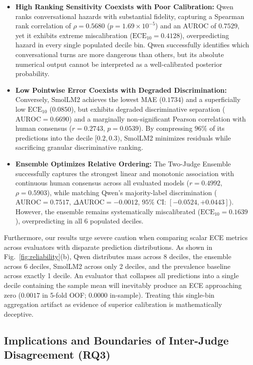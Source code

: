 \begin{itemize}
    \item \textbf{High Ranking Sensitivity Coexists with Poor Calibration:} Qwen ranks conversational hazards with substantial fidelity, capturing a Spearman rank correlation of $\rho=0.5680$ ($p=1.69\times 10^{-5}$) and an $\text{AUROC}$ of $0.7529$, yet it exhibits extreme miscalibration ($\text{ECE}_{10}=0.4128$), overpredicting hazard in every single populated decile bin. Qwen successfully identifies which conversational turns are more dangerous than others, but its absolute numerical output cannot be interpreted as a well-calibrated posterior probability.
    \item \textbf{Low Pointwise Error Coexists with Degraded Discrimination:} Conversely, SmolLM2 achieves the lowest MAE ($0.1734$) and a superficially low $\text{ECE}_{10}$ ($0.0850$), but exhibits degraded discriminative separation ($\text{AUROC}=0.6690$) and a marginally non-significant Pearson correlation with human consensus ($r=0.2743$, $p=0.0539$). By compressing $96\%$ of its predictions into the decile $[0.2, 0.3)$, SmolLM2 minimizes residuals while sacrificing granular discriminative ranking.
    \item \textbf{Ensemble Optimizes Relative Ordering:} The Two-Judge Ensemble successfully captures the strongest linear and monotonic association with continuous human consensus across all evaluated models ($r=\mathbf{0.4992}$, $\rho=\mathbf{0.5903}$), while matching Qwen's majority-label discrimination ($\text{AUROC}=0.7517$, $\Delta\text{AUROC}=-0.0012$, $95\%$ CI: $[-0.0524, +0.0443]$). However, the ensemble remains systematically miscalibrated ($\text{ECE}_{10}=0.1639$), overpredicting in all 6 populated deciles.
\end{itemize}

Furthermore, our results urge severe caution when comparing scalar ECE metrics across evaluators with disparate prediction distributions. As shown in Fig.~\ref{fig:reliability}(b), Qwen distributes mass across 8 deciles, the ensemble across 6 deciles, SmolLM2 across only 2 deciles, and the prevalence baseline across exactly 1 decile. An evaluator that collapses all predictions into a single decile containing the sample mean will inevitably produce an ECE approaching zero ($0.0017$ in 5-fold OOF; $0.0000$ in-sample). Treating this single-bin aggregation artifact as evidence of superior calibration is mathematically deceptive.

\subsection{Implications and Boundaries of Inter-Judge Disagreement (RQ3)}
\label{subsec:disc_disagreement_implications}

